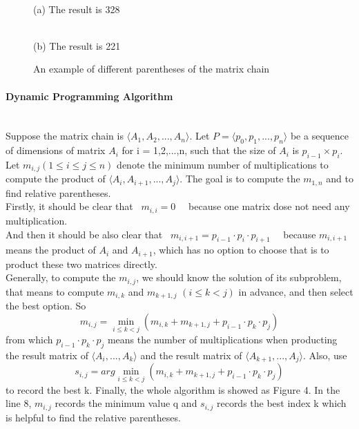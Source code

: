 \documentclass[11pt]{article}
\begin{document}
\begin{figure}[H]
\centering
\begin{minipage}{0.5\textwidth}
  \centering
	\fbox{\texttt{[image: dp1]} } \\(a) The result is 328
	\label{fig:dp1}
\end{minipage}%
\begin{minipage}{0.5\textwidth}
  \centering
	\fbox{\texttt{[image: dp2]} } \\(b) The result is 221
	\label{fig:dp2}
\end{minipage}
\caption{An example of different parentheses of the matrix chain}
\end{figure}		

		\paragraph{Dynamic Programming Algorithm}
\hfill \\

Suppose the matrix chain is $\langle A_1,A_2,...,A_n \rangle$. Let $P = \langle p_0,p_1,...,p_n \rangle$ be a sequence of dimensions of matrix $A_i$ for i = 1,2,...,n, such that the size of $A_i$ is $p_{i-1}\times p_i$. Let $m_{i,j} (1 \leq i \leq j \leq n)$ denote the minimum number of multiplications to compute the product of $\langle A_i,A_{i+1},...,A_j \rangle$. The goal is to compute the $m_{1,n}$ and to find relative parentheses. \\

Firstly, it should be clear that  \  $m_{i,i}=0$ \ \  because one matrix dose not need any multiplication. \\And then it should be also clear that \ $m_{i,i+1}=p_{i-1} \cdot p_{i} \cdot p_{i+1}$ \ \  because $m_{i,i+1}$ means the product of $A_i$ and $A_{i+1}$, which has no option to choose that is to product these two matrices directly. \\Generally, to compute the $m_{i,j}$, we should know the solution of its subproblem, that means to compute $m_{i,k}$ and $m_{k+1,j}$ $(i \leq k < j)$ in advance, and then select the best option. So $$m_{i,j}= \min_{i \leq k < j}(m_{i,k}+m_{k+1,j}+p_{i-1} \cdot p_k \cdot p_j)$$ from which $p_{i-1} \cdot p_k \cdot p_j$ means the number of multiplications when producting the result matrix of $\langle A_i,...,A_k \rangle$ and the result matrix of $\langle A_{k+1},...,A_j \rangle$. Also, use $$s_{i,j}=arg\min_{i \leq k < j}(m_{i,k}+m_{k+1,j}+p_{i-1} \cdot p_k \cdot p_j)$$ to record the best k. Finally, the whole algorithm is showed as Figure 4. In  the line 8, $m_{i,j}$ records the minimum value q and $s_{i,j}$ records the best index k which is helpful to find the relative parentheses.\\
\end{document}
